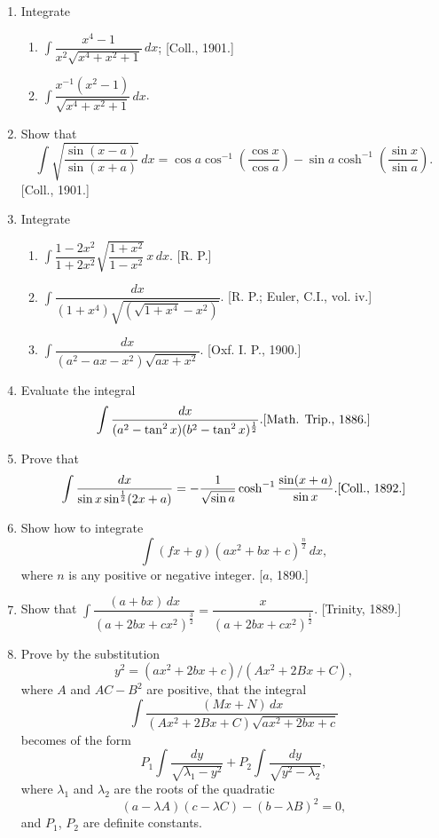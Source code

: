 \documentclass[11pt, a4paper]{article}
\newcommand{\source}[1]{\hfill\textnormal{[#1]}}
\begin{document}
\begin{enumerate}[leftmargin=2em]
\item Integrate
\begin{enumerate}[label=(\roman*)]
\item $\displaystyle\int \dfrac{x^4-1}{x^2\sqrt{x^4+x^2+1}}\,dx$; \source{Coll., 1901.}
\item $\displaystyle\int \dfrac{x^{-1}(x^2-1)}{\sqrt{x^4+x^2+1}}\,dx$.
\end{enumerate}

\item Show that
\[
\int \sqrt{\dfrac{\sin(x-a)}{\sin(x+a)}}\,dx=\cos a\cos^{-1}\left(\dfrac{\cos x}{\cos a}\right)-\sin a\cosh^{-1}\left(\dfrac{\sin x}{\sin a}\right).
\]
\source{Coll., 1901.}

\item Integrate
\begin{enumerate}[label=(\roman*)]
\item $\displaystyle\int \dfrac{1-2x^2}{1+2x^2}\sqrt{\dfrac{1+x^2}{1-x^2}}\,x\,dx$. \source{R. P.}
\item $\displaystyle\int \dfrac{dx}{(1+x^4)\sqrt{\left(\sqrt{1+x^4}-x^2\right)}}$. \source{R. P.; Euler, C.I., vol. iv.}
\item $\displaystyle\int \dfrac{dx}{(a^2-ax-x^2)\sqrt{ax+x^2}}$. \source{Oxf. I. P., 1900.}
\end{enumerate}

\item Evaluate the integral
\[
\int \dfrac{dx}{(a^2-\tan^2x)(b^2-\tan^2x)^{\frac12}}. \source{Math. Trip., 1886.}
\]

\item Prove that
\[
\int \dfrac{dx}{\sin x\sin^{\frac12}(2x+a)}=-\dfrac{1}{\sqrt{\sin a}}\cosh^{-1}\dfrac{\sin(x+a)}{\sin x}. \source{Coll., 1892.}
\]

\item Show how to integrate
\[
\int (fx+g)(ax^2+bx+c)^{\frac{n}{2}}\,dx,
\]
where $n$ is any positive or negative integer. \source{$a$, 1890.}

\item Show that $\displaystyle\int \dfrac{(a+bx)\,dx}{(a+2bx+cx^2)^{\frac32}}=\dfrac{x}{(a+2bx+cx^2)^{\frac12}}$. \source{Trinity, 1889.}

\item Prove by the substitution
\[
y^2=(ax^2+2bx+c)/(Ax^2+2Bx+C),
\]
where $A$ and $AC-B^2$ are positive, that the integral
\[
\int \dfrac{(Mx+N)\,dx}{(Ax^2+2Bx+C)\sqrt{ax^2+2bx+c}}
\]
becomes of the form
\[
P_1\int \dfrac{dy}{\sqrt{\lambda_1-y^2}}+P_2\int \dfrac{dy}{\sqrt{y^2-\lambda_2}},
\]
where $\lambda_1$ and $\lambda_2$ are the roots of the quadratic
\[
(a-\lambda A)(c-\lambda C)-(b-\lambda B)^2=0,
\]
and $P_1$, $P_2$ are definite constants.


\end{enumerate}
\end{document}
